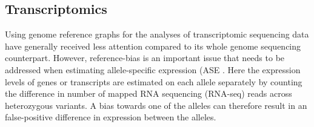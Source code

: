 \subsection{Transcriptomics}

Using genome reference graphs for the analyses of transcriptomic sequencing data have generally received less attention compared to its whole genome sequencing counterpart.
However, reference-bias is an important issue that needs to be addressed when estimating allele-specific expression (ASE \cite{Degner2009-vw,Castel2015-ef}.
Here the expression levels of genes or transcripts are estimated on each allele separately by counting the difference in number of mapped RNA sequencing (RNA-seq) reads across heterozygous variants.
A bias towards one of the alleles can therefore result in an false-positive difference in expression between the alleles. \\

